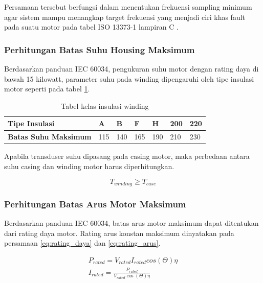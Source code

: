 \documentclass{elsinta}
\begin{document}
    Persamaan tersebut berfungsi dalam menentukan
    frekuensi sampling minimum agar sistem
    mampu menangkap target frekuensi yang menjadi
    ciri khas fault pada suatu motor pada tabel
    ISO 13373-1 lampiran C \cite{InternationalOrganizationforStandardization2002}.

\subsubsection{Perhitungan Batas Suhu Housing Maksimum}
    Berdasarkan panduan IEC 60034, pengukuran suhu motor dengan
    rating daya di bawah 15 kilowatt,
    parameter suhu pada winding dipengaruhi
    oleh tipe insulasi motor seperti pada tabel 
    \ref{tab:insulation_class}\cite{InternationalElectrotechnicalCommission2022}.
    
    \begin{table}[H]
    \centering
    \caption{Tabel kelas insulasi winding\cite{deSwardt2002}}
    \label{tab:insulation_class}
    \begin{tabular}{|p{3cm}|p{1.5cm}|p{1.5cm}|p{1.5cm}|p{1.5cm}|p{1.5cm}|p{1.5cm}|}
        \hline
        \textbf{Tipe Insulasi} &\textbf{A} & \textbf{B} & \textbf{F} & \textbf{H} & \textbf{200} & \textbf{220}\\
        \hline
        \textbf{Batas Suhu Maksimum} & 115 & 140 & 165 & 190 & 210 & 230 \\
        \hline
    \end{tabular}
    \end{table}

    Apabila transduser suhu dipasang pada
    casing motor, maka perbedaan antara suhu casing
    dan winding motor harus diperhitungkan.

    \[T_{winding} \geq T_{case}\]

\subsubsection{Perhitungan Batas Arus Motor Maksimum}
    Berdasarkan panduan IEC 60034, batas arus motor maksimum
    dapat ditentukan dari rating daya motor. Rating
    arus konstan maksimum dinyatakan pada persamaan
    \ref{eq:rating_daya} dan \ref{eq:rating_arus}.

    \begin{align}
        \label{eq:rating_daya}
        P_{rated}=V_{rated} I_{rated} cos(\Theta) \eta\\ 
        \label{eq:rating_arus}
        I_{rated}=\frac{P_{rated}}{V_{rated} \cos(\Theta) \eta}
    \end{align}
\end{document}
